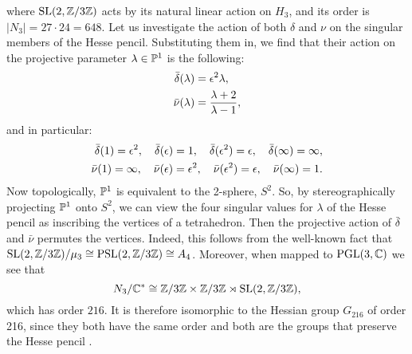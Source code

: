 where $\operatorname{SL}(2,\mathbb{Z}/3\mathbb{Z})$ acts by its natural linear action on $H_{3}$, and its order is $|N_{3}| = 27\cdot 24 = 648$. Let us investigate the action of both $\delta$ and $\nu$ on the singular members of the Hesse pencil. Substituting them in, we find that their action on the projective parameter $\lambda \in \mathbb{P}^{1}$ is the following:
\begin{equation*}
	\begin{split}
	\bar{\delta}(\lambda) &= \epsilon^{2} \lambda,\\
	\bar{\nu}(\lambda) &= \frac{\lambda + 2}{\lambda - 1},
	\end{split}
\end{equation*}
and in particular:
\begin{equation*}
	\begin{split}
	\bar{\delta}(1) = \epsilon^{2},\quad \bar{\delta}(\epsilon) = 1,\quad \bar{\delta}(\epsilon^{2}) = \epsilon,\quad \bar{\delta}(\infty) = \infty,\\
	\bar{\nu}(1) = \infty,\quad \bar{\nu}(\epsilon) = \epsilon^{2},\quad \bar{\nu}(\epsilon^{2}) = \epsilon,\quad \bar{\nu}(\infty) = 1.
	\end{split}
\end{equation*}
Now topologically, $\mathbb{P}^{1}$ is equivalent to the 2-sphere, $S^{2}$. So, by stereographically projecting $\mathbb{P}^{1}$ onto $S^{2}$, we can view the four singular values for $\lambda$ of the Hesse pencil as inscribing the vertices of a tetrahedron. Then the projective action of $\bar{\delta}$ and $\bar{\nu}$ permutes the vertices. Indeed, this follows from the well-known fact that $\operatorname{SL}(2,\mathbb{Z}/3\mathbb{Z})/\mu_{3} \cong \operatorname{PSL}(2,\mathbb{Z}/3\mathbb{Z}) \cong A_{4}$. Moreover, when mapped to $\operatorname{PGL}(3,\mathbb{C})$ we see that
\begin{equation*}
	N_{3}/\mathbb{C}^{\ast} \cong \mathbb{Z}/3\mathbb{Z}\times \mathbb{Z}/3\mathbb{Z} \rtimes \operatorname{SL}(2,\mathbb{Z}/3\mathbb{Z}),
\end{equation*}
which has order $216$. It is therefore isomorphic to the Hessian group $G_{216}$ of order 216, since they both have the same order and both are the groups that preserve the Hesse pencil \cite{Dolgachev_2006}.

